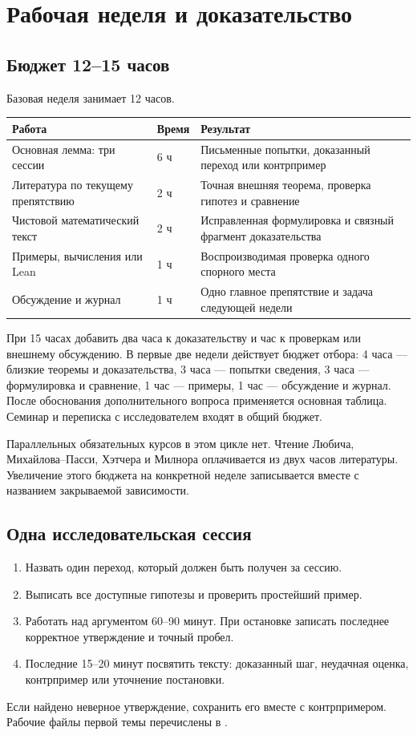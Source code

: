 \chapter{Рабочая неделя и доказательство}

\section{Бюджет 12--15 часов}
Базовая неделя занимает 12 часов.
\begin{center}
\begin{tabularx}{\textwidth}{@{}P{0.38\textwidth}P{0.1\textwidth}Y@{}}
\toprule
Работа & Время & Результат\\
\midrule
Основная лемма: три сессии & 6 ч & Письменные попытки, доказанный переход
или контрпример\\
Литература по текущему препятствию & 2 ч & Точная внешняя теорема,
проверка гипотез и сравнение\\
Чистовой математический текст & 2 ч & Исправленная формулировка
и связный фрагмент доказательства\\
Примеры, вычисления или Lean & 1 ч & Воспроизводимая проверка
одного спорного места\\
Обсуждение и журнал & 1 ч & Одно главное препятствие и задача
следующей недели\\
\bottomrule
\end{tabularx}
\end{center}
При 15 часах добавить два часа к доказательству и час к проверкам
или внешнему обсуждению. В первые две недели действует бюджет отбора:
4 часа --- близкие теоремы и доказательства, 3 часа --- попытки сведения,
3 часа --- формулировка и сравнение, 1 час --- примеры,
1 час --- обсуждение и журнал. После обоснования дополнительного вопроса
применяется основная таблица. Семинар и переписка
с исследователем входят в общий бюджет.

Параллельных обязательных курсов в этом цикле нет. Чтение Любича,
Михайлова--Пасси, Хэтчера и Милнора оплачивается из двух часов литературы.
Увеличение этого бюджета на конкретной неделе записывается вместе
с названием закрываемой зависимости.

\section{Одна исследовательская сессия}
\begin{enumerate}
\item Назвать один переход, который должен быть получен за сессию.
\item Выписать все доступные гипотезы и проверить простейший пример.
\item Работать над аргументом 60--90 минут. При остановке записать
      последнее корректное утверждение и точный пробел.
\item Последние 15--20 минут посвятить тексту: доказанный шаг, неудачная
      оценка, контрпример или уточнение постановки.
\end{enumerate}
Если найдено неверное утверждение, сохранить его вместе с контрпримером.
Рабочие файлы первой темы перечислены в .

